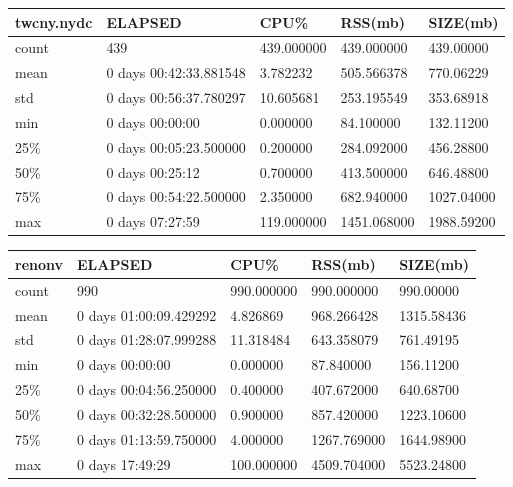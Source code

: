 \documentclass{article}
\begin{document}
\begin{tabular}{|l|l|l|l|l|}
\hline 
\hline twcny.nydc& ELAPSED&   CPU\%&  RSS(mb)&   SIZE(mb) \\
\hline count&    439& 439.000000&  439.000000&  439.00000 \\
\hline mean&  0 days 00:42:33.881548&  3.782232&  505.566378&  770.06229 \\
\hline std&  0 days 00:56:37.780297&  10.605681&  253.195549&  353.68918 \\
\hline min&   0 days 00:00:00&  0.000000&  84.100000&  132.11200 \\
\hline 25\%&  0 days 00:05:23.500000&  0.200000&  284.092000&  456.28800 \\
\hline 50\%&   0 days 00:25:12&  0.700000&  413.500000&  646.48800 \\
\hline 75\%&  0 days 00:54:22.500000&  2.350000&  682.940000& 1027.04000 \\
\hline max&   0 days 07:27:59& 119.000000& 1451.068000& 1988.59200 \\
\hline 
\end{tabular}
 
\begin{tabular}{|l|l|l|l|l|}
\hline 
\hline renonv& ELAPSED&   CPU\%&  RSS(mb)&   SIZE(mb) \\
\hline count&    990& 990.000000&  990.000000&  990.00000 \\
\hline mean&  0 days 01:00:09.429292&  4.826869&  968.266428& 1315.58436 \\
\hline std&  0 days 01:28:07.999288&  11.318484&  643.358079&  761.49195 \\
\hline min&   0 days 00:00:00&  0.000000&  87.840000&  156.11200 \\
\hline 25\%&  0 days 00:04:56.250000&  0.400000&  407.672000&  640.68700 \\
\hline 50\%&  0 days 00:32:28.500000&  0.900000&  857.420000& 1223.10600 \\
\hline 75\%&  0 days 01:13:59.750000&  4.000000& 1267.769000& 1644.98900 \\
\hline max&   0 days 17:49:29& 100.000000& 4509.704000& 5523.24800 \\
\hline 
\end{tabular}
 
\end{document}

